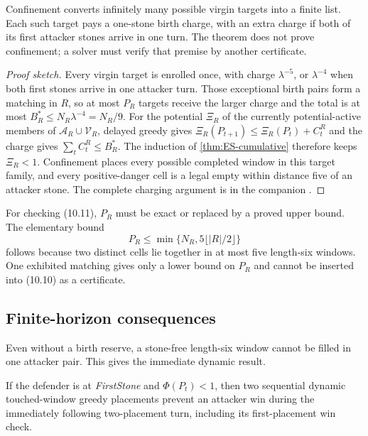 \begin{plainterms}
Confinement converts infinitely many possible virgin targets into a finite
list.  Each such target pays a one-stone birth charge, with an extra charge if
both of its first attacker stones arrive in one turn.  The theorem does not
prove confinement; a solver must verify that premise by another certificate.
\end{plainterms}

\begin{proof}[Proof sketch]
Every virgin target is enrolled once, with charge $\lambda^{-5}$, or
$\lambda^{-4}$ when both first stones arrive in one attacker turn.
Those exceptional birth pairs form a matching in $R$, so at most $P_R$ targets
receive the larger charge and the total is at most
$B_R^*\leq N_R\lambda^{-4}=N_R/9$.
For the potential $\Xi_R$ of the currently potential-active members of
$\mathcal A_R\cup\mathcal V_R$, delayed greedy gives
$\Xi_R(P_{t+1})\leq\Xi_R(P_t)+C_t^R$ and the charge gives
$\sum_tC_t^R\leq B_R^*$.
The induction of \cref{thm:ES-cumulative} therefore keeps $\Xi_R<1$.
Confinement places every possible completed window in this target family, and
every positive-danger cell is a legal empty within distance five of an
attacker stone.
The complete charging argument is in the companion
\cite{hexobot-companions}.
\end{proof}

For checking \textup{(10.11)}, $P_R$ must be exact or replaced by a proved
upper bound.  The elementary bound
\[
 P_R\leq\min\{N_R,5\lfloor |R|/2\rfloor\}
\]
follows because two distinct cells lie together in at most five length-six
windows.  One exhibited matching gives only a lower bound on $P_R$ and cannot
be inserted into \textup{(10.10)} as a certificate.

\subsection{Finite-horizon consequences}

Even without a birth reserve, a stone-free length-six window cannot be filled
in one attacker pair.  This gives the immediate dynamic result.

\begin{theorem}
\label{thm:ES-one-cycle}
If the defender is at \emph{FirstStone} and $\Phi(P_t)<1$, then two sequential
dynamic touched-window greedy placements prevent an attacker win during the
immediately following two-placement turn, including its first-placement win
check.
\end{theorem}

